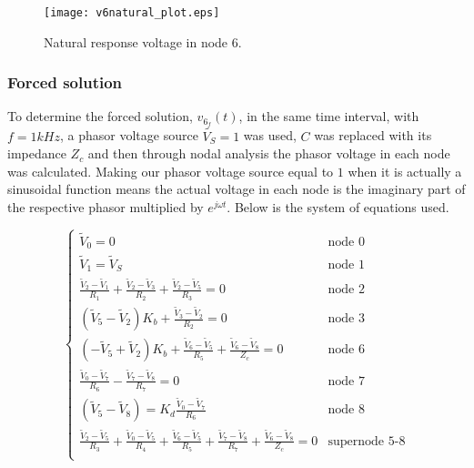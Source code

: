 

\begin{figure}[H] \centering
\texttt{[image: v6natural\_plot.eps]}
\caption{Natural response voltage in node 6.}
\label{fig:natural}
\end{figure}


\subsubsection{Forced solution}  %
\label{subsubsec:theor_forced}
To determine the forced solution, $v_{6_{f}}(t)$, in the same time interval, with $f=1kHz$, a phasor voltage source $\tilde{V_S}=1$ was used, $C$ was replaced with its impedance $Z_c$ and then through nodal analysis the phasor voltage in each node was calculated. Making our phasor voltage source equal to $1$ when it is actually a sinusoidal function means the actual voltage in each node is the imaginary part of the respective phasor multiplied by $e^{j \omega t}$. Below is the system of equations used.


\begin{equation}
  \begin{cases}
  \tilde{V}_0 = 0 & \mbox{node 0} \\
   \tilde{V}_1 = \tilde{V}_S & \mbox{node 1} \\
  \frac{\tilde{V}_2-\tilde{V}_1}{R_1}+\frac{\tilde{V}_2-\tilde{V}_3}{R_2}+\frac{\tilde{V}_2-\tilde{V}_5}{R_3} = 0 & \mbox{node 2} \\
  (\tilde{V}_5-\tilde{V}_2)K_b + \frac{\tilde{V}_3-\tilde{V}_2}{R_2} = 0 & \mbox{node 3} \\
  (-\tilde{V}_5+\tilde{V}_2)K_b + \frac{\tilde{V}_6-\tilde{V}_5}{R_5} + \frac{\tilde{V}_6-\tilde{V}_8}{Z_c} = 0 & \mbox{node 6} \\
  \frac{\tilde{V}_0-\tilde{V}_7}{R_6} - \frac{\tilde{V}_7-\tilde{V}_8}{R_7} = 0 & \mbox{node 7} \\
  (\tilde{V}_5-\tilde{V}_8) = K_d \frac{\tilde{V}_0-\tilde{V}_7}{R_6} & \mbox{node 8} \\
  \frac{\tilde{V}_2-\tilde{V}_5}{R_3} + \frac{\tilde{V}_0-\tilde{V}_5}{R_4} + \frac{\tilde{V}_6-\tilde{V}_5}{R_5} + \frac{\tilde{V}_7-\tilde{V}_8}{R_7} + \frac{\tilde{V}_6-\tilde{V}_8}{Z_c} = 0 & \mbox{supernode 5-8} \\ 
  \end{cases}
\end{equation}

